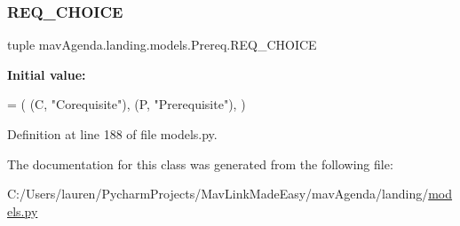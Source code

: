 \subsubsection{\texorpdfstring{R\+E\+Q\+\_\+\+C\+H\+O\+I\+CE}{REQ\_CHOICE}}
{\footnotesize\ttfamily tuple mav\+Agenda.\+landing.\+models.\+Prereq.\+R\+E\+Q\+\_\+\+C\+H\+O\+I\+CE\hspace{0.3cm}{\ttfamily [static]}}

{\bfseries Initial value\+:}
\begin{DoxyCode}
=  (
        (C, \textcolor{stringliteral}{"Corequisite"}),
        (P, \textcolor{stringliteral}{"Prerequisite"}),
    )
\end{DoxyCode}


Definition at line 188 of file models.\+py.



The documentation for this class was generated from the following file\+:\begin{DoxyCompactItemize}
\item 
C\+:/\+Users/lauren/\+Pycharm\+Projects/\+Mav\+Link\+Made\+Easy/mav\+Agenda/landing/\mbox{\hyperlink{models_8py}{models.\+py}}\end{DoxyCompactItemize}
